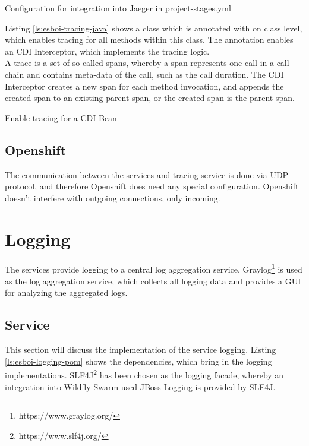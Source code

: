 \begin{listing}[h]
	\caption{Configuration for integration into Jaeger in project-stages.yml}
	\label{ls:esboi-tracing-project-stages}
\end{listing}

Listing \vref{ls:esboi-tracing-java} shows a class which is annotated with  on class level, which enables tracing for all methods within this class. The annotation  enables an CDI Interceptor, which implements the tracing logic. \\

A trace is a set of so called spans, whereby a span represents one call in a call chain and contains meta-data of the call, such as the call duration. The CDI Interceptor creates a new span for each method invocation, and appends the created span to an existing parent span, or the created span is the parent span. 

\begin{listing}[h]
	\caption{Enable tracing for a CDI Bean}
	\label{ls:esboi-tracing-java}
\end{listing}

\subsection{Openshift}
\label{sec:esbi-tracing-openshift}
The communication between the services and tracing service is done via UDP protocol, and therefore Openshift does need any special configuration. Openshift doesn't interfere with outgoing connections, only incoming.

\section{Logging}
\label{sec:esbi-logging}
The services provide logging to a central log aggregation service. Graylog\footnote{https://www.graylog.org/} is used as the log aggregation service, which collects all logging data and provides a GUI for analyzing the aggregated logs.

\subsection{Service}
\label{sec:esbi-logging-service}
This section will discuss the implementation of the service logging. Listing \vref{ls:esboi-logging-pom} shows the dependencies, which bring in the logging implementations. SLF4J\footnote{https://www.slf4j.org/} has been chosen as the logging facade, whereby an integration into Wildfly Swarm used JBoss Logging is provided by SLF4J.

